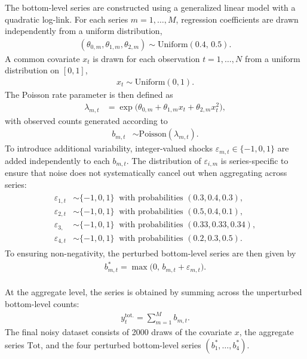 The bottom-level series are constructed using a generalized linear model with a quadratic log-link. For each series \(m=1,\dots,M\), regression coefficients are drawn independently from a uniform distribution,
\begin{align*}
(\theta_{0,m}, \theta_{1,m}, \theta_{2,m}) \sim \text{Uniform}(0.4,\,0.5).
\end{align*}
A common covariate \(x_{t}\) is drawn for each observation \(t=1,\dots,N\) from a uniform distribution on \([0,1]\),
\begin{align*}
x_{t} \sim \text{Uniform}(0, 1).
\end{align*}
The Poisson rate parameter is then defined as
\begin{align*}
\lambda_{m,t} &= \exp\!\big( \theta_{0,m} + \theta_{1,m}x_t + \theta_{2,m} x_t^2 \big),
\end{align*}
with observed counts generated according to
\begin{align*}
b_{m,t} &\sim \text{Poisson}(\lambda_{m,t}).
\end{align*}
To introduce additional variability, integer-valued shocks
\(\varepsilon_{m,t} \in \{-1,0,1\}\) are added independently to each \(b_{m,t}\).
The distribution of \(\varepsilon_{i,m}\) is series-specific to ensure that noise does not systematically cancel out when aggregating across series:
\begin{align*}
\begin{aligned}
\varepsilon_{1,t} &\sim \{-1,0,1\} \;\; \text{with probabilities } (0.3,0.4,0.3), \\
\varepsilon_{2,t} &\sim \{-1,0,1\} \;\; \text{with probabilities } (0.5,0.4,0.1), \\
\varepsilon_{3,} &\sim \{-1,0,1\} \;\; \text{with probabilities } (0.33,0.33,0.34), \\
\varepsilon_{4,t} &\sim \{-1,0,1\} \;\; \text{with probabilities } (0.2,0.3,0.5).
\end{aligned}
\end{align*}
To ensuring non-negativity, the perturbed bottom-level series are then given by
\begin{align*}
b^{*}_{m,t} = \max\!\big(0,\, b_{m,t} + \varepsilon_{m,t}\big).
\end{align*}\\
At the aggregate level, the series is obtained by summing across the unperturbed bottom-level counts:
\begin{align*}
y^\text{tot.}_t  = \sum_{m=1}^M b_{m,t}.
\end{align*}
The final noisy dataset consists of 2000 draws of the covariate \(x\), the aggregate series \(\text{Tot}\), and the four perturbed bottom-level series \((b^{\ast}_{1},\dots,b^{\ast}_{4})\).

